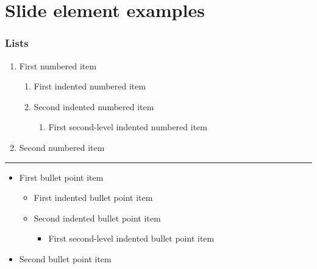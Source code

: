 \documentclass[
	aspectratio=169, %
	12pt, %
	t, %
]{beamer}
\begin{document}

\section{Slide element examples}


\begin{frame}
	\frametitle{Lists}

	\begin{enumerate}
		\item First numbered item
		\begin{enumerate}
			\item First indented numbered item
			\item Second indented numbered item
			\begin{enumerate}
				\item First second-level indented numbered item
			\end{enumerate}
		\end{enumerate}
		\item Second numbered item
	\end{enumerate}

	\rule{\textwidth}{0.25pt}

	\begin{itemize}
		\item First bullet point item
		\begin{itemize}
			\item First indented bullet point item
			\item Second indented bullet point item
			\begin{itemize}
				\item First second-level indented bullet point item
			\end{itemize}
		\end{itemize}
		\item Second bullet point item
	\end{itemize}
\end{frame}

\end{document}
